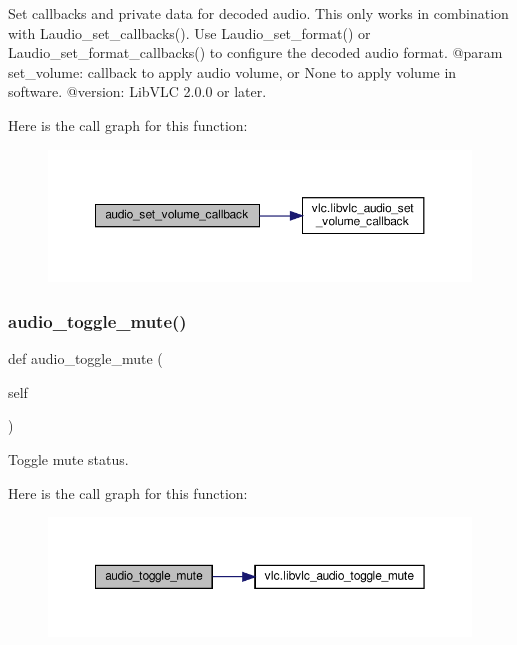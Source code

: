 \begin{DoxyVerb}Set callbacks and private data for decoded audio. This only works in
combination with L{audio_set_callbacks}().
Use L{audio_set_format}() or L{audio_set_format_callbacks}()
to configure the decoded audio format.
@param set_volume: callback to apply audio volume, or None to apply volume in software.
@version: LibVLC 2.0.0 or later.
\end{DoxyVerb}
 Here is the call graph for this function\+:
\nopagebreak
\begin{figure}[H]
\begin{center}
\leavevmode
\includegraphics[width=350pt]{classvlc_1_1_media_player_a3fd19a06fa06a933d41903bfb219af6d_cgraph}
\end{center}
\end{figure}
\mbox{\label{classvlc_1_1_media_player_abecba50fe9816ec62aeacbcfa8be3c79}} 
\subsubsection{\texorpdfstring{audio\+\_\+toggle\+\_\+mute()}{audio\_toggle\_mute()}}
{\footnotesize\ttfamily def audio\+\_\+toggle\+\_\+mute (\begin{DoxyParamCaption}\item[{}]{self }\end{DoxyParamCaption})}

\begin{DoxyVerb}Toggle mute status.
\end{DoxyVerb}
 Here is the call graph for this function\+:
\nopagebreak
\begin{figure}[H]
\begin{center}
\leavevmode
\includegraphics[width=350pt]{classvlc_1_1_media_player_abecba50fe9816ec62aeacbcfa8be3c79_cgraph}
\end{center}
\end{figure}
\mbox{\label{classvlc_1_1_media_player_a134c27b04cf84027842f7e0a830908e7}} 

